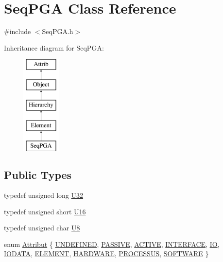 \hypertarget{classSeqPGA}{}\section{Seq\+P\+GA Class Reference}
\label{classSeqPGA}


{\ttfamily \#include $<$Seq\+P\+G\+A.\+h$>$}

Inheritance diagram for Seq\+P\+GA\+:\begin{figure}[H]
\begin{center}
\leavevmode
\includegraphics[height=5.000000cm]{classSeqPGA}
\end{center}
\end{figure}
\subsection*{Public Types}
\begin{DoxyCompactItemize}
\item 
typedef unsigned long \hyperlink{classSeqPGA_a9e9a99e1d7586223a7c118a19deef42c}{U32}
\item 
typedef unsigned short \hyperlink{classSeqPGA_ab58f68f9484bdc99722a29f533f0d4e3}{U16}
\item 
typedef unsigned char \hyperlink{classSeqPGA_ace27b11f060e537a6fd756cc3eca5347}{U8}
\item 
enum \hyperlink{classAttrib_a69e171d7cc6417835a5a306d3c764235}{Attribut} \{ \newline
\hyperlink{classAttrib_a69e171d7cc6417835a5a306d3c764235a3a8da2ab97dda18aebab196fe4100531}{U\+N\+D\+E\+F\+I\+N\+ED}, 
\hyperlink{classAttrib_a69e171d7cc6417835a5a306d3c764235a2bfb2af57b87031d190a05fe25dd92ed}{P\+A\+S\+S\+I\+VE}, 
\hyperlink{classAttrib_a69e171d7cc6417835a5a306d3c764235a3b1fec929c0370d1436f2f06e298fb0d}{A\+C\+T\+I\+VE}, 
\hyperlink{classAttrib_a69e171d7cc6417835a5a306d3c764235aa27c16b480a369ea4d18b07b2516bbc7}{I\+N\+T\+E\+R\+F\+A\+CE}, 
\newline
\hyperlink{classAttrib_a69e171d7cc6417835a5a306d3c764235a1420a5b8c0540b2af210b6975eded7f9}{IO}, 
\hyperlink{classAttrib_a69e171d7cc6417835a5a306d3c764235a0af3b0d0ac323c1704e6c69cf90add28}{I\+O\+D\+A\+TA}, 
\hyperlink{classAttrib_a69e171d7cc6417835a5a306d3c764235a7788bc5dd333fd8ce18562b269c9dab1}{E\+L\+E\+M\+E\+NT}, 
\hyperlink{classAttrib_a69e171d7cc6417835a5a306d3c764235a61ceb22149f365f1780d18f9d1459423}{H\+A\+R\+D\+W\+A\+RE}, 
\newline
\hyperlink{classAttrib_a69e171d7cc6417835a5a306d3c764235a75250e29692496e73effca2c0330977f}{P\+R\+O\+C\+E\+S\+S\+US}, 
\hyperlink{classAttrib_a69e171d7cc6417835a5a306d3c764235a103a67cd0b8f07ef478fa45d4356e27b}{S\+O\+F\+T\+W\+A\+RE}
 \}
\end{DoxyCompactItemize}

